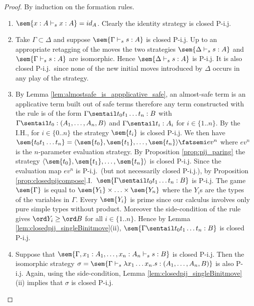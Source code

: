 \begin{proof}
  By induction on the formation rules.
  \begin{enumerate}
    \item {} $\sem{x:A \vdash_s x:A } = id_A$. Clearly the
    identity strategy is closed P-i.j.

    \item {} Take $\Gamma \subset \Delta $ and suppose $\sem{\Gamma \vdash_s
    s : A}$ is closed P-i.j. Up to an appropriate retagging of
    the moves the two strategies $\sem{\Delta \vdash_s s : A}$
    and $\sem{\Gamma \vdash_s s : A}$ are isomorphic. Hence
    $\sem{\Delta \vdash_s s : A}$ is P-i.j. It is also closed
    P-i.j.\ since none of the new initial moves introduced by
    $\Delta$ occurs in any play of the strategy.

    \item {} By Lemma \ref{lem:almostsafe_is_appplicative_safe}, an almost-safe term is  an applicative term built out of safe terms therefore any term constructed with the rule  is of the form
$\Gamma \sentail t_0 t_1 \ldots t_n : B$
with $\Gamma \sentail t_0 : (A_1,\ldots,A_n,B)$ and $\Gamma \sentail t_i : A_i$ for $i \in\{ 1..n\}$. By the I.H., for $i \in \{0..n\}$ the strategy
 $\sem{t_i}$ is closed P-i.j. We then have $\sem{t_0 t_1 \ldots t_n} = \langle \sem{ t_0}, \sem{t_1}, \ldots, \sem{t_n} \rangle \fatsemi ev^n$
    where $ev^n$ is the $n$-parameter evaluation strategy. By
    Proposition \ref{prop:pij_paring} the strategy $\langle \sem{t_0}, \sem{  t_1} , \ldots, \sem{t_n} \rangle$ is closed P-i.j. Since the evaluation map
    $ev^n$ is P-i.j.\ (but not necessarily closed P-i.j.),
    by Proposition \ref{prop:closedpijcompose}.I.\
    $\sem{ \Gamma \sentail t_0 t_1 \ldots t_n : B}$ is P-i.j. The
    game $\sem{\Gamma}$ is equal to $\sem{Y_1}
    \times \ldots \times \sem{Y_n}$ where the $Y_i$s are the
    types of the variables in $\Gamma$. Every
    $\sem{Y_i}$ is prime since our calculus involves only pure simple
    types without product. Moreover the side-condition of the
    rule gives $\ord Y_i \geq \ord B$ for all $i \in \{1..n\}$.
    Hence by Lemma \ref{lem:closedpij_singleBinitmove}(ii),
    $\sem{ \Gamma \sentail t_0 t_1 \ldots t_n : B}$ is closed
    P-i.j.

    \item {} Suppose that $\sem{\Gamma, x_1 : A_1, \ldots, x_n : A_n \vdash_s
    s : B}$ is closed P-i.j. Then the isomorphic strategy $\sigma = \sem{\Gamma \vdash_s \lambda
    x_1 \ldots x_n . s : (A_1,\ldots,A_n,B)}$ is also P-i.j.
    Again, using the side-condition, Lemma \ref{lem:closedpij_singleBinitmove}(ii)
    implies that $\sigma$ is closed P-i.j.
  \end{enumerate}
\end{proof}

